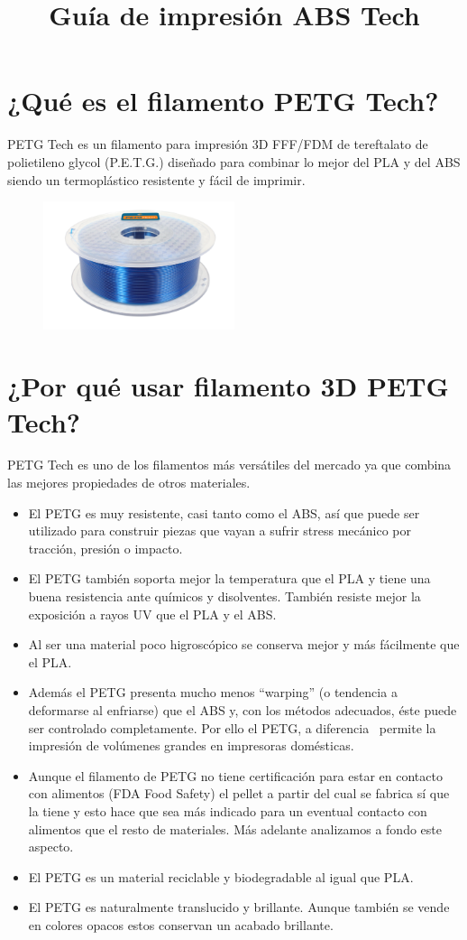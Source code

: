 \documentclass[11pt,a4paper]{article}
\title{Guía de impresión ABS Tech}
\date{}
\begin{document}

\section{¿Qué es el filamento PETG Tech?}PETG Tech es un filamento para impresión 3D FFF/FDM de tereftalato de polietileno glycol (P.E.T.G.) diseñado para combinar lo mejor del PLA y del ABS siendo un termoplástico resistente y fácil de imprimir.
\begin{figure}[H]
\centering
\includegraphics[width=0.5\textwidth,cfbox=azul_marcos 1pt 0pt]{FOTOS/PETGKILOAZUL}
\end{figure}
\section{¿Por qué usar filamento 3D PETG Tech?}
PETG Tech es uno de los filamentos más versátiles del mercado ya que combina las mejores propiedades de otros materiales.
\begin{itemize}
\item El PETG es muy resistente, casi tanto como el ABS, así que puede ser utilizado para construir piezas que vayan a sufrir stress mecánico por tracción, presión o impacto.
\item El PETG también soporta mejor la temperatura que el PLA y tiene una buena resistencia ante químicos y disolventes. También resiste mejor la exposición a rayos UV que el PLA y el ABS.
\item Al ser una material poco higroscópico se conserva mejor y más fácilmente que el PLA.
\item Además el PETG presenta mucho menos “warping” (o tendencia a deformarse al enfriarse) que el ABS y, con los métodos adecuados, éste puede ser controlado completamente. Por ello el PETG, a diferencia  permite la impresión de volúmenes grandes en impresoras domésticas.
\item Aunque el filamento de PETG no tiene certificación para estar en contacto con alimentos (FDA Food Safety) el pellet a partir del cual se fabrica sí que la tiene y esto hace que sea más indicado para un eventual contacto con alimentos que el resto de materiales. Más adelante analizamos a fondo este aspecto.
\item El PETG es un material reciclable y biodegradable al igual que PLA.
\item El PETG es naturalmente translucido y brillante. Aunque también se vende en colores opacos estos conservan un acabado brillante.
\end{itemize}
\end{document}
